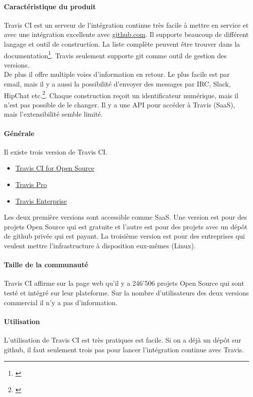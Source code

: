 \paragraph{Caractéristique du produit}
Travis CI est un serveur de l'intégration continue très facile à mettre en service et avec une intégration excellente avec \href{https://github.com/}{github.com}. Il supporte beaucoup de différent langage et outil de construction. La liste complète peuvent être trouver dans la documentation\footnote{\citep{traviscidocs}}. Travis seulement supporte git comme outil de gestion des versions.\\
De plus il offre multiple voies d'information en retour. Le plus facile est par email, mais il y a aussi la possibilité d'envoyer des messages par IRC, Slack, HipChat etc.\footnote{\citep{traviscinotification}}. Chaque construction reçoit un identificateur numérique, mais il n'est pas possible de le changer. Il y a une API pour accéder à Travis (SaaS), mais l'extensibilité semble limité.

\paragraph{Générale}
Il existe trois version de Travis CI.
\begin{itemize}
	\item \href{https://travis-ci.org/}{Travis CI for Open Source}
	\item \href{https://travis-ci.com/}{Travis Pro}
	\item \href{https://enterprise.travis-ci.com/}{Travis Enterprise}
\end{itemize}
Les deux première versions sont accessible comme SaaS. Une version est pour des projets Open Source qui est gratuite et l'autre est pour des projets avec un dépôt de github privée qui est payant. La troisième version est pour des entreprises qui veulent mettre l'infrastructure à disposition eux-mêmes (Linux).

\paragraph{Taille de la communauté}
Travis CI affirme sur la page web qu'il y a 246'506 projets Open Source qui sont testé et intégré sur leur plateforme. Sur la nombre d'utilisateurs des deux versions commercial il n'y a pas d'information.

\paragraph{Utilisation}
L'utilisation de Travis CI est très pratiques est facile. Si on a déjà un dépôt sur github, il faut seulement trois pas pour lancer l'intégration continue avec Travis.

